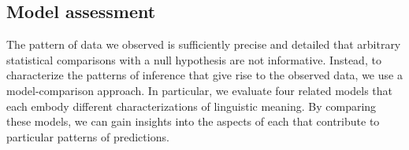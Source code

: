 \documentclass[leqno,12pt]{article}
\begin{document}

\subsection{Model assessment}



The pattern of data we observed is sufficiently precise and detailed
that arbitrary statistical comparisons with a null hypothesis are
not informative. Instead, to characterize the patterns of inference
that give rise to the observed data, we use a model-comparison
approach. In particular, we evaluate four related
models that each embody different characterizations of linguistic
meaning. By comparing these models, we can gain insights into the
aspects of each that contribute to particular patterns of predictions.


\end{document}
